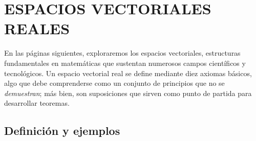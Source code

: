 \chapter[ESPACIOS VECTORIALES REALES]{ESPACIOS VECTORIALES \\ REALES}\label{chap:ev}

En las páginas siguientes, exploraremos los espacios vectoriales, estructuras fundamentales en matemáticas que sustentan numerosos campos científicos y tecnológicos. Un espacio vectorial real se define mediante diez axiomas básicos, algo que debe comprenderse como un conjunto de principios que no se \emph{demuestran}; más bien, son suposiciones que sirven como punto de partida para desarrollar teoremas.

\section{Definición y ejemplos}

